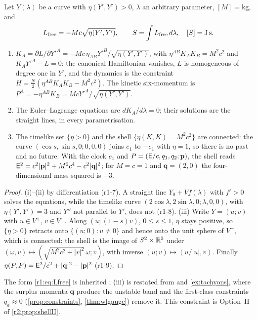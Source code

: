\begin{proposition}
\label{r1:prop:free}
Let $Y(\lambda)$ be a curve with $\eta(Y',Y')>0$, $\lambda$ an arbitrary parameter, $[M]=\mathrm{kg}$, and
\begin{equation}
\label{r1:eq:Lfree}
L_{\rm free}=-Mc\sqrt{\eta(Y',Y')},\qquad S=\int L_{\rm free}\,d\lambda,\quad [S]=\mathrm{J\,s}.
\end{equation}
\begin{enumerate}[label=(\roman*),leftmargin=2.2em]
\item $K_A=\partial L/\partial Y'^A=-Mc\,\eta_{AB}Y'^B/\sqrt{\eta(Y',Y')}$, with $\eta^{AB}K_AK_B=M^2c^2$ and $K_AY'^A-L=0$: the
canonical Hamiltonian vanishes, $L$ is homogeneous of degree one in $Y'$, and the dynamics is the constraint
$H=\tfrac N2(\eta^{AB}K_AK_B-M^2c^2)$. The kinetic six-momentum is $P^A=-\eta^{AB}K_B=McY'^A/\sqrt{\eta(Y',Y')}$.
\item The Euler--Lagrange equations are $dK_A/d\lambda=0$; their solutions are the straight lines, in every parametrisation.
\item The timelike set $\{\eta>0\}$ and the shell $\{\eta(K,K)=M^2c^2\}$ are connected: the curve $(\cos s,\sin s,0;0,0,0)$
joins $e_1$ to $-e_1$ with $\eta=1$, so there is no past and no future. With the clock $e_1$ and $P=(\mathsf E/c,q_1,q_2;\mathbf p)$, the shell reads
$\mathsf E^2=c^2|\mathbf p|^2+M^2c^4-c^2|\mathbf q|^2$; for $M=c=1$ and $\mathbf q=(2,0)$ the four-dimensional mass squared is $-3$.
\end{enumerate}
\end{proposition}

\begin{proof}
(i)--(ii) by differentiation (r1-7). A straight line $Y_0+Vf(\lambda)$ with $f'>0$ solves the equations, while the timelike curve
$(2\cos\lambda,2\sin\lambda,0;\lambda,0,0)$, with $\eta(Y',Y')=3$ and $Y''$ not parallel to $Y'$, does not (r1-8). (iii) Write $Y=(u;v)$
with $u\in V^+$, $v\in V^-$. Along $(u;(1-s)v)$, $0\le s\le1$, $\eta$ stays positive, so $\{\eta>0\}$ retracts onto $\{(u;0):u\neq0\}$
and hence onto the unit sphere of $V^+$, which is connected; the shell is the image of $S^2\times\mathbb{R}^3$ under
$(\omega,v)\mapsto(\sqrt{M^2c^2+|v|^2}\,\omega;v)$, with inverse $(u;v)\mapsto(u/|u|,v)$. Finally $\eta(P,P)=\mathsf
E^2/c^2+|\mathbf q|^2-|\mathbf p|^2$ (r1-9).
\end{proof}

The form \eqref{r1:eq:Lfree} is inherited \cite{LandauLifshitz2}; (iii) is restated from  and \cref{ex:tachyons}, where the surplus momenta $\mathbf q$ produce the unstable band and the first-class constraints $q_a\approx0$ (\cref{prop:constraints},
\cref{thm:wlgauge}) remove it. This constraint is Option~II of \cref{r2:prop:shellII}.

